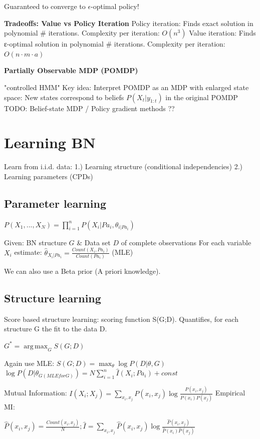 \documentclass[a4paper, 11pt, landscape]{article}
\DeclareMathOperator*{\argmax}{arg\,max}
\begin{document}
\begin{multicols*}{3}
Guaranteed to converge to $\epsilon$-optimal policy!

\textbf{Tradeoffs: Value vs Policy Iteration}
Policy iteration: Finds exact solution in polynomial \# iterations. Complexity per iteration: $O(n^3)$
Value iteration: Finds ε-optimal solution in polynomial \# iterations. Complexity per iteration: $O(n\cdot m \cdot a)$

\textbf{Partially Observable MDP (POMDP)}

"controlled HMM"
Key idea: Interpret POMDP as an MDP with enlarged state space: New states correspond to beliefs $P(X_t | y_{1:t})$ in the original POMDP
TODO: Belief-state MDP / Policy gradient methods ??

\section{Learning BN}
Learn from i.i.d. data: 1.) Learning structure (conditional independencies) 2.) Learning parameters (CPDs)

\subsection{Parameter learning} 

$P(X_1, ..., X_N) = \prod_{i=1}^{n} P(X_i | Pa_i, {\theta}_{i | Pa_i})$

Given:  BN structure $G$ \& Data set $D$ of complete observations
For each variable $X_i$ estimate: $\hat{\theta}_{X_i | Pa_i} = \frac{Count(X_i , Pa_i)}{Count(Pa_i)}$ (MLE)

We can also use a Beta prior (A priori knowledge).

\subsection{Structure learning}

Score based structure learning: scoring function S(G;D). Quantifies, for each structure G the fit to the data D. 

$G^* = \argmax_G S(G;D)$

Again use MLE: $S(G;D) = \max_\theta \log P(D | \theta, G)$
$\log P(D | \theta_{G (MLE for G)}) = N \sum_{i=1}^{n} \hat{I}(X_i ; Pa_i) + const$

Mutual Information: $I(X_i; X_j) = \sum_{x_i, x_j} P(x_i, x_j) \log \frac{P(x_i, x_j)}{P(x_i) P(x_j)}$
Empirical MI: 

$\hat{P}(x_i, x_j) = \frac{Count(x_i, x_j)}{N}; \hat{I} = \sum_{x_i, x_j} \hat{P}(x_i, x_j) \log \frac{\hat{P}(x_i, x_j)}{\hat{P}(x_i) \hat{P}(x_j)}$


\end{multicols*}
\end{document}
